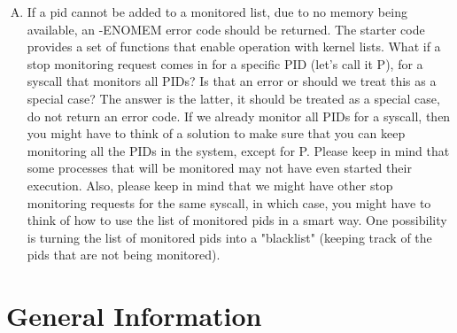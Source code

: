 \documentclass[12pt]{article}
\begin{document}
\begin{itemize}
\begin{enumerate}[A.]
\begin{itemize}
    \end{itemize}
    \item If a pid cannot be added to a monitored list, due to no memory being available, an -ENOMEM error code should be returned. The starter code provides a set of functions that enable operation with kernel lists.
    What if a stop monitoring request comes in for a specific PID (let's call it P), for a syscall that monitors all PIDs? Is that an error or should we treat this as a special case? The answer is the latter, it should be treated as a special case, do not return an error code. If we already monitor all PIDs for a syscall, then you might have to think of a solution to make sure that you can keep monitoring all the PIDs in the system, except for P. Please keep in mind that some processes that will be monitored may not have even started their execution. Also, please keep in mind that we might have other stop monitoring requests for the same syscall, in which case, you might have to think of how to use the list of monitored pids in a smart way. One possibility is turning the list of monitored pids into a "blacklist" (keeping track of the pids that are not being monitored).
    \end{enumerate}
\end{itemize}

\section{General Information}
\end{document}

